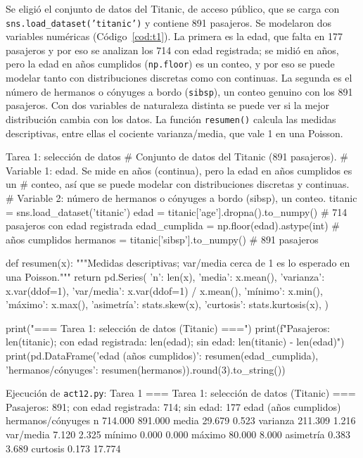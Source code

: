 \documentclass[11pt,letterpaper]{article}
\begin{document}
Se eligió el conjunto de datos del Titanic, de acceso público, que se carga con \texttt{sns.load\_dataset('titanic')} y contiene 891 pasajeros. Se modelaron dos variables numéricas (Código~\ref{cod:t1}). La primera es la edad, que falta en 177 pasajeros y por eso se analizan los 714 con edad registrada; se midió en años, pero la edad en años cumplidos (\texttt{np.floor}) es un conteo, y por eso se puede modelar tanto con distribuciones discretas como con continuas. La segunda es el número de hermanos o cónyuges a bordo (\texttt{sibsp}), un conteo genuino con los 891 pasajeros. Con dos variables de naturaleza distinta se puede ver si la mejor distribución cambia con los datos. La función \texttt{resumen()} calcula las medidas descriptivas, entre ellas el cociente varianza/media, que vale 1 en una Poisson.

\begin{codigo}[label=cod:t1]{Tarea 1: selección de datos}
# Conjunto de datos del Titanic (891 pasajeros).
# Variable 1: edad. Se mide en años (continua), pero la edad en años cumplidos es un
# conteo, así que se puede modelar con distribuciones discretas y continuas.
# Variable 2: número de hermanos o cónyuges a bordo (sibsp), un conteo.
titanic = sns.load_dataset('titanic')
edad = titanic['age'].dropna().to_numpy()   # 714 pasajeros con edad registrada
edad_cumplida = np.floor(edad).astype(int)  # años cumplidos
hermanos = titanic['sibsp'].to_numpy()      # 891 pasajeros


def resumen(x):
    """Medidas descriptivas; var/media cerca de 1 es lo esperado en una Poisson."""
    return pd.Series({
        'n': len(x), 'media': x.mean(), 'varianza': x.var(ddof=1),
        'var/media': x.var(ddof=1) / x.mean(), 'mínimo': x.min(), 'máximo': x.max(),
        'asimetría': stats.skew(x), 'curtosis': stats.kurtosis(x),
    })


print("=== Tarea 1: selección de datos (Titanic) ===")
print(f"Pasajeros: {len(titanic)}; con edad registrada: {len(edad)}; sin edad: {len(titanic) - len(edad)}")
print(pd.DataFrame({'edad (años cumplidos)': resumen(edad_cumplida),
                    'hermanos/cónyuges': resumen(hermanos)}).round(3).to_string())
\end{codigo}

\begin{consola}[label=out:out1]{Ejecución de \texttt{act12.py}: Tarea 1}
=== Tarea 1: selección de datos (Titanic) ===
Pasajeros: 891; con edad registrada: 714; sin edad: 177
           edad (años cumplidos)  hermanos/cónyuges
n                        714.000            891.000
media                     29.679              0.523
varianza                 211.309              1.216
var/media                  7.120              2.325
mínimo                     0.000              0.000
máximo                    80.000              8.000
asimetría                  0.383              3.689
curtosis                   0.173             17.774
\end{consola}
\end{document}
